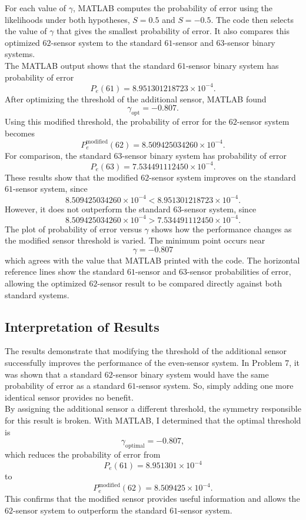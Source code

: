 \documentclass[12pt,a4paper]{article}
\begin{document}
For each value of \(\gamma\), MATLAB computes the probability of error using the likelihoods under both hypotheses, \(S=0.5\) and \(S=-0.5\). The code then selects the value of \(\gamma\) that gives the smallest probability of error. It also compares this optimized \(62\)-sensor system to the standard \(61\)-sensor and \(63\)-sensor binary systems.\\

The MATLAB output shows that the standard \(61\)-sensor binary system has probability of error
\[
P_e(61)=8.951301218723\times10^{-4}.
\]
After optimizing the threshold of the additional sensor, MATLAB found
\[
\gamma_{\text{opt}}=-0.807.
\]
Using this modified threshold, the probability of error for the \(62\)-sensor system becomes
\[
P_e^{\text{modified}}(62)=8.509425034260\times10^{-4}.
\]
For comparison, the standard \(63\)-sensor binary system has probability of error
\[
P_e(63)=7.534491112450\times10^{-4}.
\]
These results show that the modified \(62\)-sensor system improves on the standard \(61\)-sensor system, since
\[
8.509425034260\times10^{-4}
<
8.951301218723\times10^{-4}.
\]
However, it does not outperform the standard \(63\)-sensor system, since
\[
8.509425034260\times10^{-4}
>
7.534491112450\times10^{-4}.
\]
The plot of probability of error versus \(\gamma\) shows how the performance changes as the modified sensor threshold is varied. The minimum point occurs near
\[
\boxed{\gamma=-0.807}
\]
which agrees with the value that MATLAB printed with the code. The horizontal reference lines show the standard \(61\)-sensor and \(63\)-sensor probabilities of error, allowing the optimized \(62\)-sensor result to be compared directly against both standard systems.

\subsection{Interpretation of Results}

The results demonstrate that modifying the threshold of the additional sensor successfully improves the performance of the even-sensor system. In Problem 7, it was shown that a standard \(62\)-sensor binary system would have the same probability of error as a standard \(61\)-sensor system. So, simply adding one more identical sensor provides no benefit.\\

By assigning the additional sensor a different threshold, the symmetry responsible for this result is broken. With MATLAB, I determined that the optimal threshold is
\[
\gamma_{\text{optimal}}=-0.807,
\]
which reduces the probability of error from
\[
P_e(61)=8.951301\times10^{-4}
\]
to
\[
P_e^{\text{modified}}(62)=8.509425\times10^{-4}.
\]
This confirms that the modified sensor provides useful information and allows the \(62\)-sensor system to outperform the standard \(61\)-sensor system.\\
\end{document}
